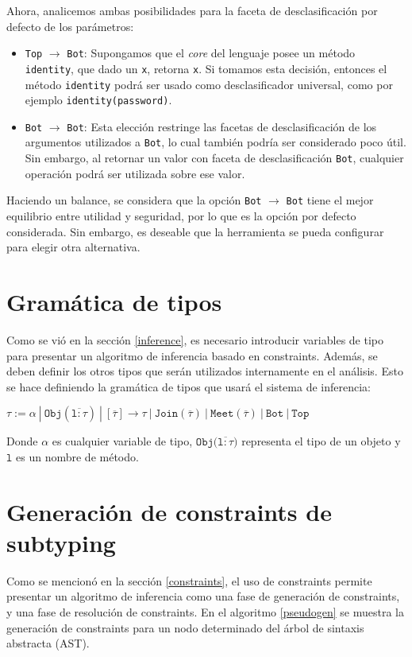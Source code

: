 Ahora, analicemos ambas posibilidades para la faceta de desclasificación por defecto de los parámetros:

\begin{itemize}
  \item \texttt{Top} $\rightarrow$ \texttt{Bot}: Supongamos que el \textit{core} del lenguaje posee un método \texttt{identity}, que dado un \texttt{x}, retorna \texttt{x}. Si tomamos esta decisión, entonces el método \texttt{identity} podrá ser usado como desclasificador universal, como por ejemplo \texttt{identity(password)}.
  \item \texttt{Bot} $\rightarrow$ \texttt{Bot}: Esta elección restringe las facetas de desclasificación de los argumentos utilizados a \texttt{Bot}, lo cual también podría ser considerado poco útil. Sin embargo, al retornar un valor con faceta de desclasificación \texttt{Bot}, cualquier operación podrá ser utilizada sobre ese valor.
\end{itemize}

Haciendo un balance, se considera que la opción \texttt{Bot} $\rightarrow$ \texttt{Bot} tiene el mejor equilibrio entre utilidad y seguridad, por lo que es la opción por defecto considerada. Sin embargo, es deseable que la herramienta se pueda configurar para elegir otra alternativa.

\section{Gramática de tipos}
Como se vió en la sección \ref{inference}, es necesario introducir variables de tipo para presentar un algoritmo de inferencia basado en constraints. Además, se deben definir los otros tipos que serán utilizados internamente en el análisis. Esto se hace definiendo la gramática de tipos que usará el sistema de inferencia:

  $\mathtt{\tau := \alpha\ |\ Obj(\overline{l: \tau})\ |\ [\overline{\tau}] \rightarrow \tau \ |\ Join(\overline{\tau})\ |\ Meet(\overline{\tau})\ |\ Bot\ |\ Top}$

Donde $\alpha$ es cualquier variable de tipo, $\mathtt{Obj(\overline{l: \tau}})$ representa el tipo de un objeto y $\mathtt{l}$ es un nombre de método.

\section{Generación de constraints de subtyping} \label{propuestaGen}
Como se mencionó en la sección \ref{constraints}, el uso de constraints permite presentar un algoritmo de inferencia como una fase de generación de constraints, y una fase de resolución de constraints. En el algoritmo \ref{pseudogen} se muestra la generación de constraints para un nodo determinado del árbol de sintaxis abstracta (AST).

